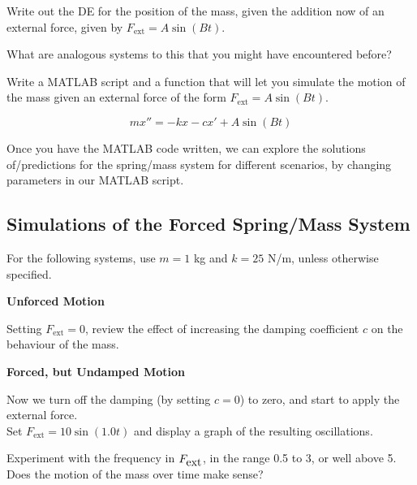  \problem Write out the DE for the position of the mass, given the
 addition now of an external force, given by
 $F_{\mbox{ext}} = A \sin(Bt)$.  \vfill

What are analogous systems to this that you might have encountered
before?

\vfill

\newpage

\problem Write a MATLAB script and a function that will let you
simulate the motion of the mass given an external force of the form
$F_{\mbox{ext}} = A \sin(Bt)$.

$$m x'' = -kx -c x' + A \sin(Bt)$$

\vfill

Once you have the MATLAB code written, we can explore the solutions
of/predictions for the spring/mass system for different scenarios, by
changing parameters in our MATLAB script.

\newpage

\subsection*{Simulations of the Forced Spring/Mass System}

For the following systems, use $m = 1$ kg and $k = 25$ N/m, unless
otherwise specified.

{\bf Unforced Motion}

\problem Setting $F_{\mbox{ext}} = 0$, review the effect of increasing
the damping coefficient $c$ on the behaviour of the mass.

\vfill

\newpage

{\bf Forced, but Undamped Motion}

Now we turn off the damping (by setting $c=0$) to zero, and
start to apply the external force. \\
\problem Set $F_{\mbox{ext}} = 10 \sin(1.0 t)$ and display a graph of the resulting oscillations.   \\

\vfill

Experiment with the frequency in $F_{\mbox{ext}}$, in the range 0.5 to 3, or well
above 5.  Does the motion of the mass over time make sense?

\vfill

\newpage


